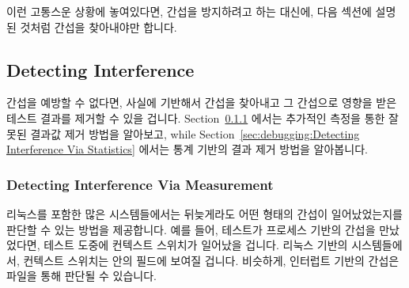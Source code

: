 이런 고통스운 상황에 놓여있다면, 간섭을 방지하려고 하는 대신에, 다음 섹션에
설명된 것처럼 간섭을 찾아내야만 합니다.

\subsection{Detecting Interference}
\label{sec:debugging:Detecting Interference}

간섭을 예방할 수 없다면, 사실에 기반해서 간섭을 찾아내고 그 간섭으로 영향을
받은 테스트 결과를 제거할 수 있을 겁니다.
Section~\ref{sec:debugging:Detecting Interference Via Measurement} 에서는
추가적인 측정을 통한 잘못된 결과값 제거 방법을 알아보고,
while Section~\ref{sec:debugging:Detecting Interference Via Statistics} 에서는
통계 기반의 결과 제거 방법을 알아봅니다.

\subsubsection{Detecting Interference Via Measurement}
\label{sec:debugging:Detecting Interference Via Measurement}


리눅스를 포함한 많은 시스템들에서는 뒤늦게라도 어떤 형태의 간섭이
일어났었는지를 판단할 수 있는 방법을 제공합니다.
예를 들어, 테스트가 프로세스 기반의 간섭을 만났었다면, 테스트 도중에 컨텍스트
스위치가 일어났을 겁니다.
리눅스 기반의 시스템들에서, 컨텍스트 스위치는  안의
 필드에 보여질 겁니다.
비슷하게, 인터럽트 기반의 간섭은  파일을 통해 판단될 수
있습니다.

